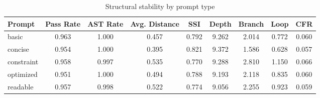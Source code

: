 \begin{table}[t]
\centering
\caption{Structural stability by prompt type}
\label{tab:prompt_structural_stability}
\begin{tabular}{lcccccccc}
\toprule
Prompt & Pass Rate & AST Rate & Avg. Distance & SSI & Depth & Branch & Loop & CFR \\
\midrule
basic & 0.963 & 1.000 & 0.457 & 0.792 & 9.262 & 2.014 & 0.772 & 0.060 \\
concise & 0.954 & 1.000 & 0.395 & 0.821 & 9.372 & 1.586 & 0.628 & 0.057 \\
constraint & 0.958 & 0.997 & 0.535 & 0.770 & 9.288 & 2.810 & 1.150 & 0.066 \\
optimized & 0.951 & 1.000 & 0.494 & 0.788 & 9.193 & 2.118 & 0.835 & 0.060 \\
readable & 0.957 & 0.998 & 0.522 & 0.774 & 9.056 & 2.255 & 0.923 & 0.059 \\
\bottomrule
\end{tabular}
\end{table}

